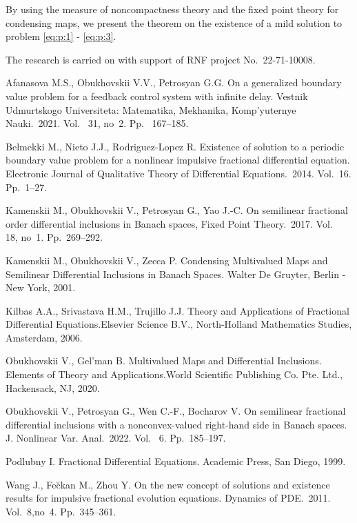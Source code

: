 \documentclass[12pt]{llncs}
\begin{document}
By using the measure of noncompactness theory and the fixed point theory for condensing maps, we present the theorem on the existence of a mild solution to problem  \eqref{eq:p:1} - \eqref{eq:p:3}.


The research is carried on with support of RNF project No.~22-71-10008.

\begin{thebibliography}{9} %

  Afanasova M.S.,  Obukhovskii V.V., Petrosyan G.G. On a generalized boundary value problem for a feedback control system with infinite delay. Vestnik Udmurtskogo Universiteta: Matematika, Mekhanika, Komp'yuternye Nauki.~2021. Vol.~ 31, no~2. Pp.~ 167--185.


  Belmekki M.,  Nieto J.J.,  Rodriguez-Lopez R. Existence of solution to a periodic boundary value problem for a nonlinear impulsive fractional differential equation. Electronic Journal of Qualitative Theory of Differential Equations.~2014. Vol.~16. Pp.~1--27.

  Kamenskii M.,  Obukhovskii V.,  Petrosyan G.,  Yao J.-C. On semilinear fractional order differential inclusions in Banach spaces, Fixed Point Theory.~2017. Vol.~ 18, no~1. Pp.~269--292.

 Kamenskii M., Obukhovskii V., Zecca P. Condensing Multivalued Maps and Semilinear Differential Inclusions in Banach Spaces. Walter De Gruyter, Berlin - New York, 2001.

 Kilbas A.A.,  Srivastava H.M.,  Trujillo J.J.  Theory and
Applications of Fractional Differential Equations.Elsevier Science B.V., North-Holland Mathematics Studies, Amsterdam, 2006.

   Obukhovskii V.,  Gel'man B. Multivalued Maps and Differential Inclusions. Elements of Theory and Applications.World Scientific Publishing Co. Pte. Ltd., Hackensack, NJ, 2020.

   Obukhovskii V.,  Petrosyan G.,  Wen C.-F.,  Bocharov V. On semilinear fractional differential inclusions with a nonconvex-valued right-hand side in Banach spaces. J. Nonlinear Var. Anal.~2022. Vol.~ 6. Pp.~185--197.

  Podlubny I. Fractional Differential Equations. Academic Press, San Diego, 1999.


  Wang J.,  Fe\u{c}kan M., Zhou Y. On the new concept of solutions and existence results for impulsive fractional evolution equations. Dynamics of PDE.~2011. Vol.~8,no~4. Pp.~345--361.

\end{thebibliography}

\end{document}
